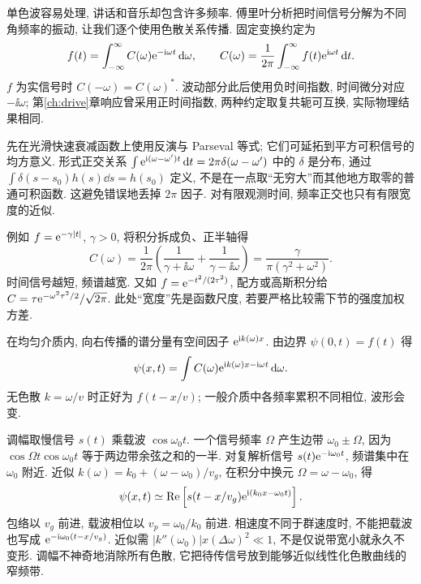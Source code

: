 \label{ch:fourier}
单色波容易处理, 讲话和音乐却包含许多频率. 傅里叶分析把时间信号分解为不同角频率的振动, 让我们逐个使用色散关系传播. 固定变换约定为
\begin{equation}\label{eq:ft}
f(t)=\int_{-\infty}^{\infty}C(\omega)\mathrm e^{-\mathrm i\omega t}\,\mathrm d\omega,
\qquad C(\omega)=\frac1{2\pi}\int_{-\infty}^{\infty}f(t)\mathrm e^{\mathrm i\omega t}\,\mathrm d t.
\end{equation}
$f$ 为实信号时 $C(-\omega)=C(\omega)^*$. 波动部分此后使用负时间指数, 时间微分对应 $-\ii\omega$; 第\ref{ch:drive}章响应曾采用正时间指数, 两种约定取复共轭可互换, 实际物理结果相同.

先在光滑快速衰减函数上使用反演与 Parseval 等式; 它们可延拓到平方可积信号的均方意义. 形式正交关系 $\int\mathrm e^{\mathrm i(\omega-\omega')t}\,\mathrm d t=2\pi\delta(\omega-\omega')$ 中的 $\delta$ 是分布, 通过 $\int\delta(s-s_0)h(s)\dd s=h(s_0)$ 定义, 不是在一点取“无穷大”而其他地方取零的普通可积函数. 这避免错误地丢掉 $2\pi$ 因子. 对有限观测时间, 频率正交也只有有限宽度的近似.

例如 $f=\mathrm e^{-\gamma|t|}$, $\gamma>0$, 将积分拆成负、正半轴得
\[
C(\omega)=\frac1{2\pi}\left(\frac1{\gamma+\ii\omega}+\frac1{\gamma-\ii\omega}\right)
=\frac{\gamma}{\pi(\gamma^2+\omega^2)}.
\]
时间信号越短, 频谱越宽. 又如 $f=\mathrm e^{-t^2/(2\tau^2)}$, 配方或高斯积分给 $C=\tau\mathrm e^{-\omega^2\tau^2/2}/\sqrt{2\pi}$. 此处“宽度”先是函数尺度, 若要严格比较需下节的强度加权方差.

在均匀介质内, 向右传播的谱分量有空间因子 $\mathrm e^{\mathrm i k(\omega)x}$. 由边界 $\psi(0,t)=f(t)$ 得
\[
\psi(x,t)=\int C(\omega)\mathrm e^{\mathrm i k(\omega)x-\mathrm i\omega t}\,\mathrm d\omega.
\]
无色散 $k=\omega/v$ 时正好为 $f(t-x/v)$; 一般介质中各频率累积不同相位, 波形会变.

调幅取慢信号 $s(t)$ 乘载波 $\cos\omega_0t$. 一个信号频率 $\Omega$ 产生边带 $\omega_0\pm\Omega$, 因为 $\cos\Omega t\cos\omega_0t$ 等于两边带余弦之和的一半. 对复解析信号 $s(t)\mathrm e^{-\mathrm i\omega_0t}$, 频谱集中在 $\omega_0$ 附近. 近似 $k(\omega)=k_0+(\omega-\omega_0)/v_g$, 在积分中换元 $\Omega=\omega-\omega_0$, 得
\[
\psi(x,t)\simeq\operatorname{Re}\left[s(t-x/v_g)\mathrm e^{\mathrm i(k_0x-\omega_0t)}\right].
\]
包络以 $v_g$ 前进, 载波相位以 $v_p=\omega_0/k_0$ 前进. 相速度不同于群速度时, 不能把载波也写成 $\mathrm e^{-\mathrm i\omega_0(t-x/v_g)}$. 近似需 $|k''(\omega_0)|x(\Delta\omega)^2\ll1$, 不是仅说带宽小就永久不变形. 调幅不神奇地消除所有色散, 它把待传信号放到能够近似线性化色散曲线的窄频带.


